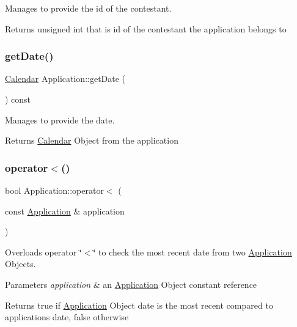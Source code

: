 Manages to provide the id of the contestant. 

\begin{DoxyReturn}{Returns}
unsigned int that is id of the contestant the application belongs to 
\end{DoxyReturn}
\mbox{\label{class_application_a2f6abd976e5ab287a89601ec7698e3a3}} 
\subsubsection{\texorpdfstring{get\+Date()}{getDate()}}
{\footnotesize\ttfamily \hyperlink{class_calendar}{Calendar} Application\+::get\+Date (\begin{DoxyParamCaption}{ }\end{DoxyParamCaption}) const}



Manages to provide the date. 

\begin{DoxyReturn}{Returns}
\hyperlink{class_calendar}{Calendar} Object from the application 
\end{DoxyReturn}
\mbox{\label{class_application_a9ac9bea7fda70aa30204d1b4f7deb4ea}} 
\subsubsection{\texorpdfstring{operator$<$()}{operator<()}}
{\footnotesize\ttfamily bool Application\+::operator$<$ (\begin{DoxyParamCaption}\item[{const \hyperlink{class_application}{Application} \&}]{application }\end{DoxyParamCaption})}



Overloads operator \char`\"{}$<$\char`\"{} to check the most recent date from two \hyperlink{class_application}{Application} Objects. 


\begin{DoxyParams}{Parameters}
{\em application} & an \hyperlink{class_application}{Application} Object constant reference \\
\hline
\end{DoxyParams}
\begin{DoxyReturn}{Returns}
true if \hyperlink{class_application}{Application} Object date is the most recent compared to application\textquotesingle{}s date, false otherwise 
\end{DoxyReturn}
\mbox{\label{class_application_ae3c4870f283dff867d10581cbbb3de5d}} 
